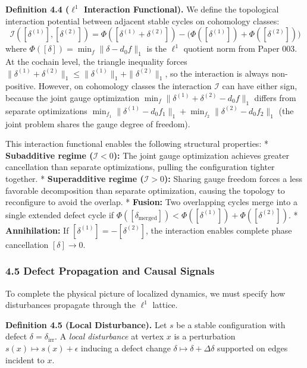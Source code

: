 \documentclass[
]{article}
\begin{document}
\textbf{Definition 4.4 (\(\ell^1\) Interaction Functional).} We define
the topological interaction potential between adjacent stable cycles on
cohomology classes:
\[ \mathcal{I}([\delta^{(1)}], [\delta^{(2)}]) = \Phi([\delta^{(1)} + \delta^{(2)}]) - \big(\Phi([\delta^{(1)}]) + \Phi([\delta^{(2)}])\big) \]
where \(\Phi([\delta]) = \min_f \|\delta - d_0 f\|_1\) is the \(\ell^1\)
quotient norm from Paper 003. At the cochain level, the triangle
inequality forces
\(\|\delta^{(1)} + \delta^{(2)}\|_1 \le \|\delta^{(1)}\|_1 + \|\delta^{(2)}\|_1\),
so the interaction is always non-positive. However, on cohomology
classes the interaction \(\mathcal{I}\) can have either sign, because
the joint gauge optimization
\(\min_f \|\delta^{(1)} + \delta^{(2)} - d_0 f\|_1\) differs from
separate optimizations
\(\min_{f_1} \|\delta^{(1)} - d_0 f_1\|_1 + \min_{f_2} \|\delta^{(2)} - d_0 f_2\|_1\)
(the joint problem shares the gauge degree of freedom).

This interaction functional enables the following structural properties:
* \textbf{Subadditive regime (\(\mathcal{I} < 0\)):} The joint gauge
optimization achieves greater cancellation than separate optimizations,
pulling the configuration tighter together. * \textbf{Superadditive
regime (\(\mathcal{I} > 0\)):} Sharing gauge freedom forces a less
favorable decomposition than separate optimization, causing the topology
to reconfigure to avoid the overlap. * \textbf{Fusion:} Two overlapping
cycles merge into a single extended defect cycle if
\(\Phi([\delta_{\text{merged}}]) < \Phi([\delta^{(1)}]) + \Phi([\delta^{(2)}])\).
* \textbf{Annihilation:} If \([\delta^{(1)}] = -[\delta^{(2)}]\), the
interaction enables complete phase cancellation \([\delta] \to 0\).

\subsubsection{4.5 Defect Propagation and Causal
Signals}\label{defect-propagation-and-causal-signals}

To complete the physical picture of localized dynamics, we must specify
how disturbances propagate through the \(\ell^1\) lattice.

\textbf{Definition 4.5 (Local Disturbance).} Let \(s\) be a stable
configuration with defect \(\delta = \delta_{\text{irr}}\). A
\emph{local disturbance} at vertex \(x\) is a perturbation
\(s(x) \mapsto s(x) + \epsilon\) inducing a defect change
\(\delta \mapsto \delta + \Delta \delta\) supported on edges incident to
\(x\).
\end{document}

